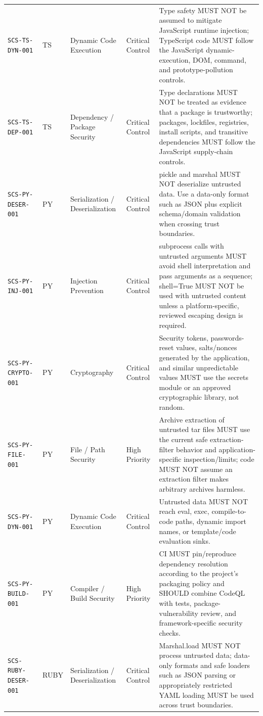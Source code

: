 \documentclass[10pt,letterpaper]{article}
\newcommand{\code}[1]{\begingroup\small\ttfamily\def\UrlFont{\ttfamily}\nolinkurl{#1}\endgroup}
\begin{document}
\begin{landscape}
\begin{longtable}{@{}P{1.3in}P{0.8in}P{1.45in}P{1.0in}P{4.65in}@{}}
\code{SCS-TS-DYN-001} & TS & Dynamic Code Execution & Critical Control & Type safety MUST NOT be assumed to mitigate JavaScript runtime injection; TypeScript code MUST follow the JavaScript dynamic-execution, DOM, command, and prototype-pollution controls.\\
\code{SCS-TS-DEP-001} & TS & Dependency / Package Security & Critical Control & Type declarations MUST NOT be treated as evidence that a package is trustworthy; packages, lockfiles, registries, install scripts, and transitive dependencies MUST follow the JavaScript supply-chain controls.\\
\code{SCS-PY-DESER-001} & PY & Serialization / Deserialization & Critical Control & pickle and marshal MUST NOT deserialize untrusted data. Use a data-only format such as JSON plus explicit schema/domain validation when crossing trust boundaries.\\
\code{SCS-PY-INJ-001} & PY & Injection Prevention & Critical Control & subprocess calls with untrusted arguments MUST avoid shell interpretation and pass arguments as a sequence; shell=True MUST NOT be used with untrusted content unless a platform-specific, reviewed escaping design is required.\\
\code{SCS-PY-CRYPTO-001} & PY & Cryptography & Critical Control & Security tokens, passwords-reset values, salts/nonces generated by the application, and similar unpredictable values MUST use the secrets module or an approved cryptographic library, not random.\\
\code{SCS-PY-FILE-001} & PY & File / Path Security & High Priority & Archive extraction of untrusted tar files MUST use the current safe extraction-filter behavior and application-specific inspection/limits; code MUST NOT assume an extraction filter makes arbitrary archives harmless.\\
\code{SCS-PY-DYN-001} & PY & Dynamic Code Execution & Critical Control & Untrusted data MUST NOT reach eval, exec, compile-to-code paths, dynamic import names, or template/code evaluation sinks.\\
\code{SCS-PY-BUILD-001} & PY & Compiler / Build Security & High Priority & CI MUST pin/reproduce dependency resolution according to the project's packaging policy and SHOULD combine CodeQL with tests, package-vulnerability review, and framework-specific security checks.\\
\code{SCS-RUBY-DESER-001} & RUBY & Serialization / Deserialization & Critical Control & Marshal.load MUST NOT process untrusted data; data-only formats and safe loaders such as JSON parsing or appropriately restricted YAML loading MUST be used across trust boundaries.\\

\end{longtable}
\end{landscape}
\end{document}
